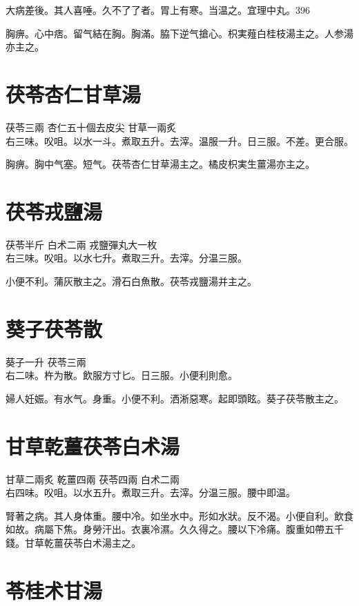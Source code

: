 大病差後。其人喜唾。久不了了者。胃上有寒。当温之。宜理中丸。396

胸痹。心中痞。留气結在胸。胸滿。脇下逆{\khaaitp 气}搶心。枳実薤白桂枝湯主之。人参湯亦主之。

\section{茯苓杏仁甘草湯}

茯苓{\scriptsize 三兩} 杏仁{\scriptsize 五十個去皮尖} 甘草{\scriptsize 一兩炙}\\
右三味。㕮咀。以水一斗。煮取五升。去滓。温服一升。日三服。不差。更合服。

胸痹。胸中气塞。短气。茯苓杏仁甘草湯主之。橘{\khaaitp 皮}枳{\khaaitp 実生}薑湯亦主之。

\section{茯苓戎鹽湯}

茯苓{\scriptsize 半斤} 白术{\scriptsize 二兩} 戎鹽{\scriptsize 彈丸大一枚}\\
右三味。㕮咀。以水七升。煮取三升。去滓。分温三服。

小便不利。蒲灰散主之。滑石白魚散。茯苓戎鹽湯并主之。

\section{葵子茯苓散}

葵子{\scriptsize 一升} 茯苓{\scriptsize 三兩}\\
右二味。杵为散。飲服方寸匕。日三服。小便利則愈。

{\khaaitp 婦人}妊娠。有水气。身重。小便不利。洒淅惡寒。起即頭眩。葵子茯苓散主之。

\section{甘草乾薑茯苓白术湯}

甘草{\scriptsize 二兩炙} 乾薑{\scriptsize 四兩} 茯苓{\scriptsize 四兩} 白术{\scriptsize 二兩}\\
右四味。㕮咀。以水五升。煮取三升。去滓。分温三服。腰中即温。

腎著之病。其人身体重。腰中冷。如坐水中。形如水狀。反不渴。小便自利。飲食如故。病屬下焦。身勞汗出。衣裏冷濕。久久得之。腰以下冷痛。腹重如帶五千錢。甘{\khaaitp 草乾}薑{\khaaitp 茯}苓{\khaaitp 白}术湯主之。

\section{苓桂术甘湯}

